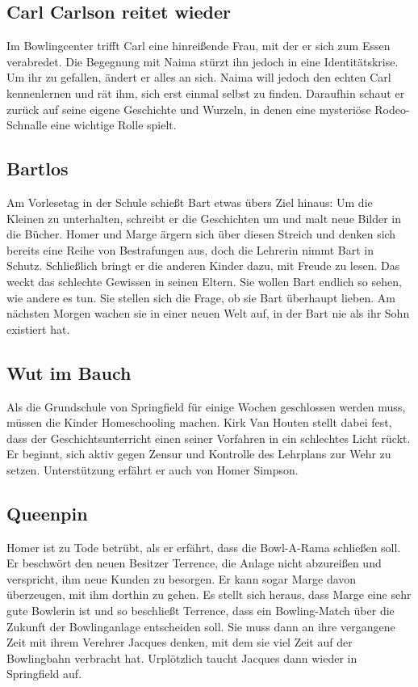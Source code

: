 \subsection{Carl Carlson reitet wieder}\label{OABF08}
Im Bowlingcenter trifft Carl eine hinreißende Frau, mit der er sich zum Essen verabredet. Die Begegnung mit Naima stürzt ihn jedoch in eine Identitätskrise. Um ihr zu gefallen, ändert er alles an sich. Naima will jedoch den echten Carl kennenlernen und rät ihm, sich erst einmal selbst zu finden. Daraufhin schaut er zurück auf seine eigene Geschichte und Wurzeln, in denen eine mysteriöse Rodeo-Schnalle eine wichtige Rolle spielt.


\subsection{Bartlos}
Am Vorlesetag in der Schule schießt Bart etwas übers Ziel hinaus: Um die Kleinen zu unterhalten, schreibt er die Geschichten um und malt neue Bilder in die Bücher. Homer und Marge ärgern sich über diesen Streich und denken sich bereits eine Reihe von Bestrafungen aus, doch die Lehrerin nimmt Bart in Schutz. Schließlich bringt er die anderen Kinder dazu, mit Freude zu lesen. Das weckt das schlechte Gewissen in seinen Eltern. Sie wollen Bart endlich so sehen, wie andere es tun. Sie stellen sich die Frage, ob sie Bart überhaupt lieben. Am nächsten Morgen wachen sie in einer neuen Welt auf, in der Bart nie als ihr Sohn existiert hat.

\subsection{Wut im Bauch}
Als die Grundschule von Springfield für einige Wochen geschlossen werden muss, müssen die Kinder Homeschooling machen. Kirk Van Houten stellt dabei fest, dass der Geschichtsunterricht einen seiner Vorfahren in ein schlechtes Licht rückt. Er beginnt, sich aktiv gegen Zensur und Kontrolle des Lehrplans zur Wehr zu setzen. Unterstützung erfährt er auch von Homer Simpson.


\subsection{Queenpin}
Homer ist zu Tode betrübt, als er erfährt, dass die Bowl-A-Rama schließen soll. Er beschwört den neuen Besitzer Terrence, die Anlage nicht abzureißen und verspricht, ihm neue Kunden zu besorgen. Er kann sogar Marge davon überzeugen, mit ihm dorthin zu gehen. Es stellt sich heraus, dass Marge eine sehr gute Bowlerin ist und so beschließt Terrence, dass ein Bowling-Match über die Zukunft der Bowlinganlage entscheiden soll. Sie muss dann an ihre vergangene Zeit mit ihrem Verehrer Jacques denken, mit dem sie viel Zeit auf der Bowlingbahn verbracht hat. Urplötzlich taucht Jacques dann wieder in Springfield auf.


